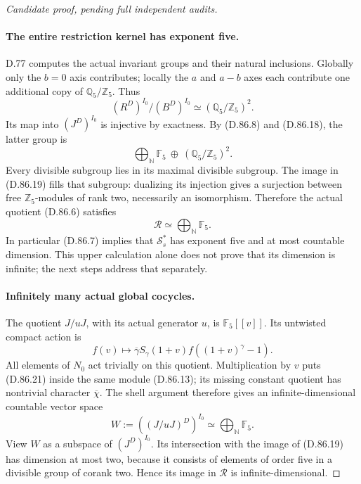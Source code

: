 \begin{proof}[Candidate proof, pending full independent audits]
\paragraph{The entire restriction kernel has exponent five.}
D.77 computes the actual invariant groups and their natural
inclusions. Globally only the \(b=0\) axis contributes; locally
the \(a\) and \(a-b\) axes each contribute one additional
copy of \(\mathbb Q_5/\mathbb Z_5\). Thus
\[
 (R^D)^{I_0}/(B^D)^{I_0}
                  \simeq(\mathbb Q_5/\mathbb Z_5)^2.   \tag{D.86.19}
\]
Its map into \((J^D)^{I_0}\) is injective by exactness.
By (D.86.8) and (D.86.18), the latter group is
\[
             \bigoplus_{\mathbb N}\mathbb F_5
                         \ \oplus\
                     (\mathbb Q_5/\mathbb Z_5)^2.
\]
Every divisible subgroup lies in its maximal divisible
subgroup. The image in (D.86.19) fills that subgroup:
dualizing its injection gives a surjection between free
\(\mathbb Z_5\)-modules of rank two, necessarily an
isomorphism. Therefore the actual quotient (D.86.6) satisfies
\[
                    \mathcal R\simeq
                         \bigoplus_{\mathbb N}\mathbb F_5.
                                                               \tag{D.86.20}
\]
In particular (D.86.7) implies that \(\mathcal S_s^*\)
has exponent five and at most countable dimension. This
upper calculation alone does not prove that its dimension
is infinite; the next steps address that separately.

\paragraph{Infinitely many actual global cocycles.}
The quotient \(J/uJ\), with its actual generator \(u\), is
\(\mathbb F_5[[v]]\). Its untwisted compact action is
\[
 f(v)\longmapsto
       \overline\gamma S_\gamma(1+v)
                      f((1+v)^\gamma-1).              \tag{D.86.21}
\]
All elements of \(N_0\) act trivially on this quotient.
Multiplication by \(v\) puts (D.86.21) inside the same
module (D.86.13); its missing constant quotient has
nontrivial character \(\overline\chi\). The shell argument
therefore gives an infinite-dimensional countable vector space
\[
 W:=((J/uJ)^D)^{I_0}\simeq\bigoplus_{\mathbb N}\mathbb F_5.
                                                               \tag{D.86.22}
\]
View \(W\) as a subspace of \((J^D)^{I_0}\).
Its intersection with the image of (D.86.19) has dimension
at most two, because it consists of elements of order five
in a divisible group of corank two. Hence its image in
\(\mathcal R\) is infinite-dimensional.


\end{proof}

